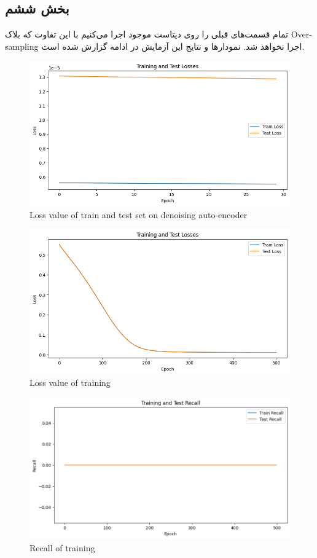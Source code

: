 \documentclass{article}
\begin{document}
\subsection{بخش ششم}


تمام قسمت‌های قبلی را روی دیتاست موجود اجرا می‌کنیم با این تفاوت که بلاک Over-sampling اجرا نخواهد شد. نمودارها و نتایج این آزمایش در ادامه گزارش شده است. 

\begin{figure}[H]
\centering
\includegraphics[width=1\linewidth]{"img/DAE loss_2"}
\caption{Loss value of train and test set on denoising auto-encoder}
\label{fig:dae-loss2}
\end{figure}


\begin{figure}[H]
\centering
\includegraphics[width=1\linewidth]{img/C_L_2}
\caption{Loss value of training}
\label{fig:cl2}
\end{figure}

\begin{figure}[H]
\centering
\includegraphics[width=1\linewidth]{img/C_R_2}
\caption{Recall of training}
\label{fig:cr2}
\end{figure}
\end{document}
